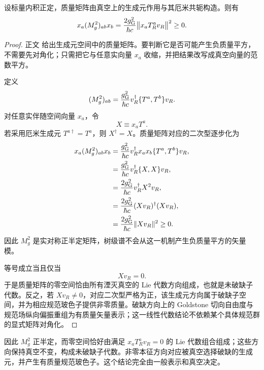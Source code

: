 \begin{proposition}
设标量内积正定，质量矩阵由真空上的生成元作用与其厄米共轭构造。则有
\begin{equation}
 {
 x_a(M_g^2)_{ab}x_b
 =\frac{2g_{\rm G}^2}{\hbar c}
 \bigl\|x_aT_R^av_R\bigr\|^2\ge0.}
\label{eq:gauge-mass-positive-quadratic-form-dp68}
\end{equation}
\end{proposition}
\begin{proof}
正文 给出生成元空间中的质量矩阵。要判断它是否可能产生负质量平方，不需要先对角化；只需把它与任意实向量 \(x_a\) 收缩，并把结果改写成真空向量的范数平方。


定义
\begin{equation*}
 (M_g^2)_{ab}
 =\frac{g_{\rm G}^2}{\hbar c}
 v_R^\dagger\{T^a,T^b\}v_R.
\end{equation*}
对任意实伴随空间向量 $x_a$，令
\begin{equation*}
 X\equiv x_aT^a.
\end{equation*}
若采用厄米生成元 $T^{a\dagger}=T^a$，则 $X^\dagger=X$。质量矩阵对应的二次型逐步化为
\begin{align*}
 x_a(M_g^2)_{ab}x_b
 &=\frac{g_{\rm G}^2}{\hbar c}
 v_R^\dagger x_ax_b\{T^a,T^b\}v_R,\\
 &=\frac{g_{\rm G}^2}{\hbar c}
 v_R^\dagger\{X,X\}v_R,\\
 &=\frac{2g_{\rm G}^2}{\hbar c}v_R^\dagger X^2v_R,\\
 &=\frac{2g_{\rm G}^2}{\hbar c}(Xv_R)^\dagger(Xv_R),\\
 &=\frac{2g_{\rm G}^2}{\hbar c}\|Xv_R\|^2\ge0.
\end{align*}
因此 $M_g^2$ 是实对称正半定矩阵，树级谱不会从这一机制产生负质量平方的矢量模。

等号成立当且仅当
\begin{equation*}
 Xv_R=0.
\end{equation*}
于是质量矩阵的零空间恰由所有湮灭真空的 Lie 代数方向组成，也就是未破缺子代数。反之，若 $Xv_R\neq0$，对应二次型严格为正，该生成元方向属于破缺子空间，并为相应规范玻色子提供非零质量。破缺方向上的 Goldstone 切向自由度与规范场纵向偏振重组为有质量矢量表示；这一线性代数结论不依赖某个具体规范群的显式矩阵对角化。
\end{proof}

因此 $M_g^2$ 正半定，而零空间恰好由满足 $x_aT_R^av_R=0$ 的 Lie 代数组合组成；这些方向保持真空不变，构成未破缺子代数。非零本征方向对应被真空选择破缺的生成元，并产生有质量规范玻色子。这个结论完全由一般表示和真空决定。

